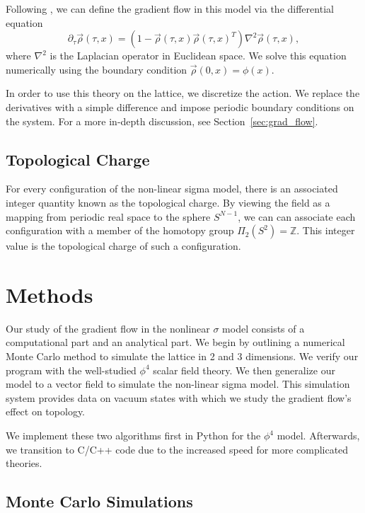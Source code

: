 \documentclass[12pt]{report}
\begin{document}
Following \cite{bietenholz2018}, we can define the gradient flow in this model via the differential equation
\begin{equation}
    \label{eq:nsm_gradflow}
    \partial_\tau \vec\rho (\tau,x) = \left( 1 - \vec\rho(\tau,x) \vec\rho(\tau,x)^T \right) \nabla^2 \vec\rho(\tau,x),
\end{equation}
where $\nabla^2$ is the Laplacian operator in Euclidean space. We solve this equation numerically using the boundary condition $\vec\rho(0,x) = \phi(x)$.

In order to use this theory on the lattice, we discretize the action. We replace the derivatives with a simple difference and impose periodic boundary conditions on the system. For a more in-depth discussion, see Section~\ref{sec:grad_flow}.

\section{Topological Charge}

For every configuration of the non-linear sigma model, there is an associated integer quantity known as the topological charge. By viewing the field as a mapping from periodic real space to the sphere $S^{N-1}$, we can can associate each configuration with a member of the homotopy group $\Pi_2(S^2) = \mathbb{Z}$. This integer value is the topological charge of such a configuration. 




\chapter{Methods}
\label{sec:methods}
Our study of the gradient flow in the nonlinear $\sigma$ model consists of a computational part and an analytical part. We begin by outlining a numerical Monte Carlo method to simulate the lattice in 2 and 3 dimensions. We verify our program with the well-studied $\phi^4$ scalar field theory. We then generalize our model to a vector field to simulate the non-linear sigma model. This simulation system provides data on vacuum states with which we study the gradient flow's effect on topology.

We implement these two algorithms first in Python for the $\phi^4$ model. Afterwards, we transition to C/C++ code due to the increased speed for more complicated theories. 

\section{Monte Carlo Simulations}
\label{sec:mc}
\end{document}
